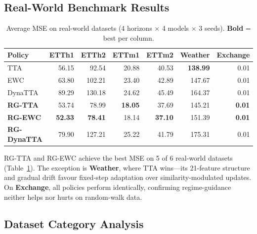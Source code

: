 \documentclass[journal]{IEEEtran}
\begin{document}
\subsection{Real-World Benchmark Results}

\begin{table}[t]
\centering
\caption{Average MSE on real-world datasets (4 horizons $\times$ 4 models $\times$ 3 seeds). \textbf{Bold} = best per column.}
\label{tab:realworld}
\small
\begin{tabular}{lrrrrrr}
\toprule
Policy & ETTh1 & ETTh2 & ETTm1 & ETTm2 & Weather & Exchange \\
\midrule
TTA & 56.15 & 92.54 & 20.88 & 40.53 & \textbf{138.99} & 0.01 \\
EWC & 63.80 & 102.21 & 23.40 & 42.89 & 147.67 & 0.01 \\
DynaTTA & 89.29 & 130.18 & 24.62 & 45.49 & 164.37 & 0.01 \\
\midrule
\textbf{RG-TTA} & 53.74 & 78.99 & \textbf{18.05} & 37.69 & 145.21 & \textbf{0.01} \\
\textbf{RG-EWC} & \textbf{52.33} & \textbf{78.41} & 18.14 & \textbf{37.10} & 151.39 & \textbf{0.01} \\
\textbf{RG-DynaTTA} & 79.90 & 127.21 & 25.22 & 41.79 & 175.31 & 0.01 \\
\bottomrule
\end{tabular}
\end{table}

RG-TTA and RG-EWC achieve the best MSE on 5 of 6 real-world datasets (Table~\ref{tab:realworld}). The exception is \textbf{Weather}, where TTA wins---its 21-feature structure and gradual drift favour fixed-step adaptation over similarity-modulated updates. On \textbf{Exchange}, all policies perform identically, confirming regime-guidance neither helps nor hurts on random-walk data.

\subsection{Dataset Category Analysis}

\begin{table}[t]
\centering
\caption{Average MSE by dataset category and policy, averaged across models and horizons.}
\label{tab:bycategory}
\small
{}%
\end{table}
\end{document}
